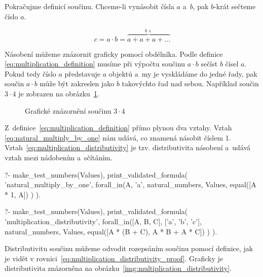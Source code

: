 Pokračujme definicí součinu. Chceme-li vynásobit čísla \(a\) a~\(b\), pak \(b\)-krát sečteme číslo \(a\).

\begin{equation}
\label{eq:multiplication_definition}
c = a \cdot b = \overbrace{a + a + a + ...}^{b \times}
\end{equation}

Násobení můžeme znázornit graficky pomocí obdélníka. Podle definice \eqref{eq:multiplication_definition} musíme při výpočtu součinu \(a \cdot b\) sečíst \(b\) čísel \(a\). Pokud tedy číslo \(a\) představuje \(a\) objektů a~my je vyskládáme do jedné řady, pak součin \(a \cdot b\) může být zakreslen jako \(b\) takovýchto řad nad sebou. Například součin \(3 \cdot 4\) je zobrazen na obrázku~\ref{img:multiplication_definition}. 

\begin{figure}[!h]
\centering
{}
\caption{Grafické znázornění součinu \(3 \cdot 4\)}
\label{img:multiplication_definition}
\end{figure}

Z~definice~\eqref{eq:multiplication_definition} přímo plynou dva vztahy. Vztah \eqref{eq:natural_multiply_by_one} nám udává, co znamená násobit číslem 1. Vztah~\eqref{eq:multiplication_distributivity} je tzv. distributivita násobení a~udává vztah mezi nádobením a~sčítáním.

\begin{fact}
\begin{prolog}
?-	make_test_numbers(Values),
	print_validated_formula(
		'natural_multiply_by_one',
		forall_in(A, 'a', natural_numbers, Values,
			equal([A * 1, A])
		)
	).				
\end{prolog}
\begin{prolog}
?-	make_test_numbers(Values),
	print_validated_formula(
		'multiplication_distributivity',
		forall_in([A, B, C], ['a', 'b', 'c'], natural_numbers, Values,
			equal([A * (B + C), A * B + A * C])
		)
	).				
\end{prolog}
\end{fact}

Distributivitu součinu můžeme odvodit rozepsáním součinu pomocí definice, jak je vidět v rovnici~\eqref{eq:multiplication_distributivity_proof}. Graficky je distributivita znázorněna na obrázku~\ref{img:multiplication_distributivity}.

